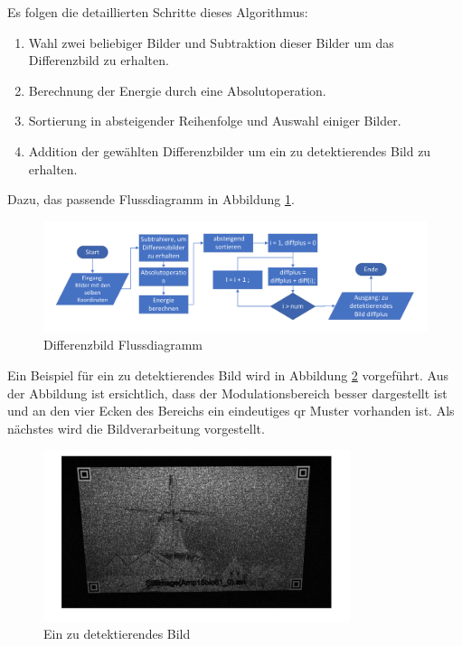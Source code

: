 Es folgen die detaillierten Schritte dieses Algorithmus:

\begin{enumerate}
	\item Wahl zwei beliebiger Bilder und Subtraktion dieser Bilder um das Differenzbild zu erhalten.
	\item Berechnung der Energie durch eine Absolutoperation.
	\item Sortierung in absteigender Reihenfolge und Auswahl einiger Bilder.
	\item Addition der gewählten Differenzbilder um ein zu detektierendes Bild zu erhalten.
\end{enumerate}

Dazu, das passende Flussdiagramm in Abbildung \ref{fig:DifferenzbildFlussigdiagramm}.
\begin{figure}[H]
 \centering 
 \includegraphics[keepaspectratio,width=1.1\textwidth]{images/3_Ersteverfahren/Differenzbild/Differenzbildflussigdiagramm.pdf}
 \caption{Differenzbild Flussdiagramm}
 \label{fig:DifferenzbildFlussigdiagramm}
\end{figure} 

Ein Beispiel für ein zu detektierendes Bild wird in Abbildung \ref{fig:EindetektiertesBild} vorgeführt. Aus der Abbildung ist ersichtlich, dass der Modulationsbereich besser dargestellt ist und an den vier Ecken des Bereichs ein eindeutiges \gls{qr} Muster vorhanden ist. Als nächstes wird die Bildverarbeitung vorgestellt.

\begin{figure}[H]
 \centering 
 \includegraphics[keepaspectratio,width=0.8\textwidth]{images/3_Ersteverfahren/Differenzbild/diffplus.pdf}
 \caption{Ein zu detektierendes Bild}
 \label{fig:EindetektiertesBild}
\end{figure} 


